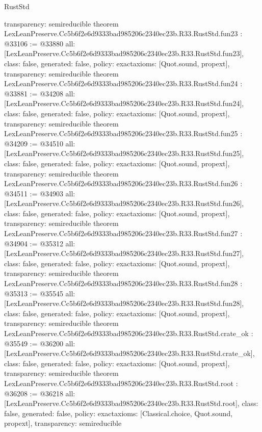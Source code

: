 \begin{lexlean}{RustStd}
\begin{coremodule}
{  transparency: semireducible
}
theorem LexLeanPreserve.Cc5b6f2e6d9333bad985206c2340ec23b.R33.RustStd.fun23 : @33106 := @33880 {
  all: [LexLeanPreserve.Cc5b6f2e6d9333bad985206c2340ec23b.R33.RustStd.fun23],
  class: false,
  generated: false,
  policy: exact{axioms: [Quot.sound, propext]},
  transparency: semireducible
}
theorem LexLeanPreserve.Cc5b6f2e6d9333bad985206c2340ec23b.R33.RustStd.fun24 : @33881 := @34208 {
  all: [LexLeanPreserve.Cc5b6f2e6d9333bad985206c2340ec23b.R33.RustStd.fun24],
  class: false,
  generated: false,
  policy: exact{axioms: [Quot.sound, propext]},
  transparency: semireducible
}
theorem LexLeanPreserve.Cc5b6f2e6d9333bad985206c2340ec23b.R33.RustStd.fun25 : @34209 := @34510 {
  all: [LexLeanPreserve.Cc5b6f2e6d9333bad985206c2340ec23b.R33.RustStd.fun25],
  class: false,
  generated: false,
  policy: exact{axioms: [Quot.sound, propext]},
  transparency: semireducible
}
theorem LexLeanPreserve.Cc5b6f2e6d9333bad985206c2340ec23b.R33.RustStd.fun26 : @34511 := @34903 {
  all: [LexLeanPreserve.Cc5b6f2e6d9333bad985206c2340ec23b.R33.RustStd.fun26],
  class: false,
  generated: false,
  policy: exact{axioms: [Quot.sound, propext]},
  transparency: semireducible
}
theorem LexLeanPreserve.Cc5b6f2e6d9333bad985206c2340ec23b.R33.RustStd.fun27 : @34904 := @35312 {
  all: [LexLeanPreserve.Cc5b6f2e6d9333bad985206c2340ec23b.R33.RustStd.fun27],
  class: false,
  generated: false,
  policy: exact{axioms: [Quot.sound, propext]},
  transparency: semireducible
}
theorem LexLeanPreserve.Cc5b6f2e6d9333bad985206c2340ec23b.R33.RustStd.fun28 : @35313 := @35545 {
  all: [LexLeanPreserve.Cc5b6f2e6d9333bad985206c2340ec23b.R33.RustStd.fun28],
  class: false,
  generated: false,
  policy: exact{axioms: [Quot.sound, propext]},
  transparency: semireducible
}
theorem LexLeanPreserve.Cc5b6f2e6d9333bad985206c2340ec23b.R33.RustStd.crate_ok : @35549 := @36200 {
  all: [LexLeanPreserve.Cc5b6f2e6d9333bad985206c2340ec23b.R33.RustStd.crate_ok],
  class: false,
  generated: false,
  policy: exact{axioms: [Quot.sound, propext]},
  transparency: semireducible
}
theorem LexLeanPreserve.Cc5b6f2e6d9333bad985206c2340ec23b.R33.RustStd.root : @36208 := @36218 {
  all: [LexLeanPreserve.Cc5b6f2e6d9333bad985206c2340ec23b.R33.RustStd.root],
  class: false,
  generated: false,
  policy: exact{axioms: [Classical.choice, Quot.sound, propext]},
  transparency: semireducible
}


\end{coremodule}
\end{lexlean}
